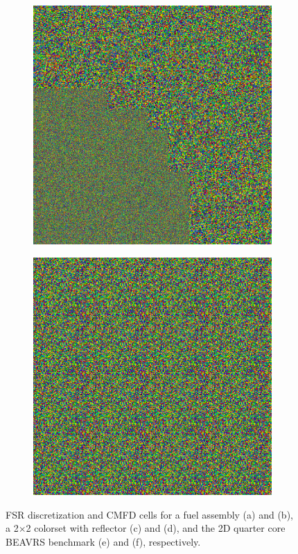 \begin{figure}[h!]
\begin{subfigure}{0.45\textwidth}
  \centering
  \includegraphics[width=0.8\linewidth]{figures/quantification/fsrs/fsrs-full-core-quarter-pin-cmfd}
  \caption{}
  \label{fig:chap8-full-core-fsrs}
\end{subfigure}%
\begin{subfigure}{0.45\textwidth}
  \centering
  \includegraphics[width=0.8\linewidth]{figures/quantification/cmfd/cmfd-cells-full-core}
  \caption{}
  \label{fig:chap8-full-core-cmfd-cells}
\end{subfigure}
\caption[FSR discretization and CMFD cells for heterogeneous benchmarks]{\ac{FSR} discretization and \ac{CMFD} cells for a fuel assembly (a) and (b), a 2$\times$2 colorset with reflector (c) and (d), and the 2D quarter core \ac{BEAVRS} benchmark (e) and (f), respectively.}
\label{fig:chap8-assm-fsrs-cmfd-cells}
\end{figure}


